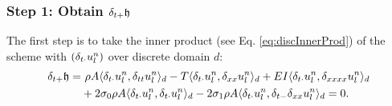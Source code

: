 {\subsubsection{Step 1: Obtain $\delta_{t+} \mathfrak{h}$}
The first step is to take the inner product (see Eq. \eqref{eq:discInnerProd}) of the scheme with $(\delta_{t\cdot} u_l^n)$ over discrete domain $d$:
\begin{equation}\label{eq:rOCStiffString}
    \begin{aligned}
    \delta_{t+} \mathfrak{h} =&\ \rho A \langle \delta_{t\cdot} u_l^n, \delta_{tt} u_l^n \rangle_d - T \langle \delta_{t\cdot} u_l^n, \delta_{xx} u_l^n\rangle_d + EI \langle \delta_{t\cdot} u_l^n, \delta_{xxxx} u_l^n \rangle_d\\
    & + 2\sigma_{0}\rho A \langle \delta_{t\cdot} u_l^n, \delta_{t\cdot} u_l^n \rangle_d - 2\sigma_{1} \rho A\langle \delta_{t\cdot} u_l^n, \delta_{t-} \delta_{xx} u_l^n \rangle_d = 0.
    \end{aligned}
\end{equation}  

}
